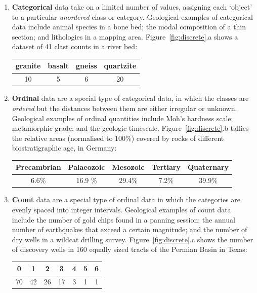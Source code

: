 \begin{enumerate}

\item\textbf{Categorical} data take on a limited number of values,
  assigning each `object' to a particular \emph{unordered} class or
  category. Geological examples of categorical data include animal
  species in a bone bed; the modal composition of a thin section; and
  lithologies in a mapping area. Figure~\ref{fig:discrete}.a shows a
  dataset of 41 clast counts in a river bed:
  \begin{center}
    \begin{tabular}{cccc}
      granite & basalt & gneiss & quartzite \\ \hline
      10 & 5 & 6 & 20  
    \end{tabular}
  \end{center}

\item\textbf{Ordinal} data are a special type of categorical data, in
  which the classes are \emph{ordered} but the distances between them
  are either irregular or unknown. Geological examples of ordinal
  quantities include Moh's hardness scale; metamorphic grade; and the
  geologic timescale. Figure~\ref{fig:discrete}.b tallies the relative
  areas (normalised to 100\%) covered by rocks of different
  biostratigraphic age, in Germany:
  \begin{center}
    \begin{tabular}{ccccc}
      Precambrian & Palaeozoic & Mesozoic & Tertiary & Quaternary\\ \hline
      6.6\% & 16.9 \% & 29.4\% & 7.2\% & 39.9\%
    \end{tabular}
  \end{center}

\item\textbf{Count} data are a special type of ordinal data in which
  the categories are evenly spaced into integer intervals. Geological
  examples of count data include the number of gold chips found in a
  panning session; the annual number of earthquakes that exceed a
  certain magnitude; and the number of dry wells in a wildcat drilling
  survey. Figure~\ref{fig:discrete}.c shows the number of discovery
  wells in 160 equally sized tracts of the Permian Basin in Texas:
  \begin{center}
    \begin{tabular}{ccccccc}
      0 & 1 & 2 & 3 & 4 & 5 & 6 \\ \hline
      70 & 42 & 26 & 17 & 3 & 1 & 1
    \end{tabular}
  \end{center}

\end{enumerate}

